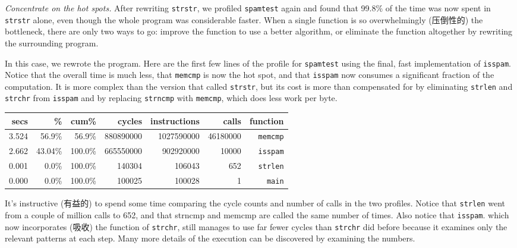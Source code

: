 \emph{Concentrate on the hot spots.} After rewriting \verb'strstr', we
profiled \verb'spamtest' again and found that 99.8\% of the time was now
spent in \verb'strstr' alone, even though the whole program was
considerable faster. When a single function is so overwhelmingly (压倒性的)
the bottleneck, there are only two ways to go: improve the function to use
a better algorithm, or eliminate the function altogether by rewriting the
surrounding program.

In this case, we rewrote the program. Here are the first few lines of the
profile for \verb'spamtest' using the final, fast implementation of
\verb'isspam'. Notice that the overall time is much less, that
\verb'memcmp' is now the hot spot, and that \verb'isspam' now consumes a
significant fraction of the computation. It is more complex than the
version that called \verb'strstr', but its cost is more than compensated
for by eliminating \verb'strlen' and \verb'strchr' from \verb'isspam' and
by replacing \verb'strncmp' with \verb'memcmp', which does less work per
byte.
\begin{tabular}{rrrrrrr}
    secs    & \%    & cum\% & cycles    & instructions  & calls & function
    \\
    \hline
    \hline
    3.524   & 56.9\%    & 56.9\%    & 880890000 & 1027590000    & 46180000
    & \verb'memcmp' \\
    2.662   & 43.04\%   & 100.0\%   & 665550000 & 902920000     & 10000
    & \verb'isspam' \\
    0.001   & 0.0\%     & 100.0\%   & 140304    & 106043        & 652
    & \verb'strlen' \\
    0.000   & 0.0\%     & 100.0\%   & 100025    & 100028        & 1
    & \verb'main'   \\
\end{tabular}

It's instructive (有益的) to spend some time comparing the cycle counts and
number of calls in the two profiles. Notice that \verb'strlen' went from a
couple of million calls to 652, and that strncmp and memcmp are called the
same number of times. Also notice that \verb'isspam'. which now
incorporates (吸收) the function of \verb'strchr', still manages to use far
fewer cycles than \verb'strchr' did before because it examines only the
relevant patterns at each step. Many more details of the execution can be
discovered by examining the numbers.

